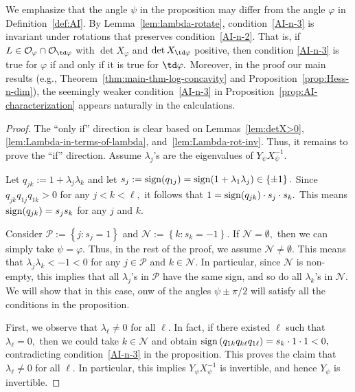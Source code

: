\documentclass[11pt]{amsart}
\numberwithin{equation}{section}
\theoremstyle{definition}
\theoremstyle{definition}
\newcommand{\set}[1]{\left\{#1\right\}}
\newcommand{\pr}[1]{\left(#1\right)}
\begin{document}
We emphasize that the angle $\psi$ in the proposition may differ from the angle $\varphi$ in Definition~\ref{def:AI}.
By Lemma~\ref{lem:lambda-rotate}, condition~\eqref{AI-n-3} is invariant under rotations that preserves condition~\eqref{AI-n-2}.
That is, if $L\in\mathcal O_{\varphi}\cap \mathcal O_{\td\varphi}$ with $\det X_{\varphi}$ and $\det X_{\td\varphi}$ positive, then condition \eqref{AI-n-3} is true for $\varphi$ if and only if it is true for $\td\varphi.$
Moreover, in the proof our main results (e.g., Theorem~\ref{thm:main-thm-log-concavity} and Proposition~\ref{prop:Hess-n-dim}), the seemingly weaker condition~\eqref{AI-n-3} in Proposition~\ref{prop:AI-characterization} appears naturally in the calculations.

\begin{proof}
	The ``only if'' direction is clear based on Lemmas~\ref{lem:detX>0}, \ref{lem:Lambda-in-terms-of-lambda}, and~\ref{lem:Lambda-rot-inv}.
	Thus, it remains to prove the ``if'' direction.
	Assume $\lambda_j$'s are the eigenvalues of $Y_\psi X_\psi^{-1}.$
	
	Let $q_{jk}:=1+\lambda_j\lambda_k$ and let
	$s_j:={\rm sign}(q_{1j})
	= {\rm sign} (1+\lambda_1\lambda_j)
	\in\set{\pm 1}.$
	Since $q_{jk}q_{1j}q_{1k}>0$ for any $j<k<\ell,$ it follows that
	$1 = {\rm sign}(q_{jk})\cdot s_j\cdot s_k.$
	This means
	${\rm sign}(q_{jk})=s_js_k$
	for any $j$ and $k.$

	Consider $\mathcal P
	:= \set{j: s_j=1}$
    and $\mathcal N
	:= \set{k: s_k=-1}.$
	If $\mathcal N=\emptyset,$ then we can simply take $\psi=\varphi.$
	Thus, in the rest of the proof, we assume $\mathcal N\neq\emptyset.$ 
	This means that $\lambda_j\lambda_k<-1<0$ for any $j\in\mathcal P$ and $k\in\mathcal N.$
	In particular, since $\mathcal N$ is non-empty, this implies that all $\lambda_j$'s in $\mathcal P$ have the same sign, and so do all $\lambda_k$'s in $\mathcal N.$
	We will show that in this case, onw of the angles $\psi \pm \pi/2$ will satisfy all the conditions in the proposition.
	
	First, we observe that $\lambda_\ell\neq 0$ for all $\ell.$
	In fact, if there existed $\ell$ such that $\lambda_\ell=0,$ then we could take $k\in\mathcal N$ and obtain
	${\rm sign}\pr{q_{1k}q_{k\ell}q_{1\ell}}
	= s_k\cdot 1\cdot 1<0,$
	contradicting condition~\eqref{AI-n-3} in the proposition.
	This proves the claim that $\lambda_\ell\neq 0$ for all $\ell.$
	In particular, this implies $Y_\psi X_\psi^{-1}$ is invertible, and hence $Y_\psi$ is invertible.
	

\end{proof}
\end{document}
